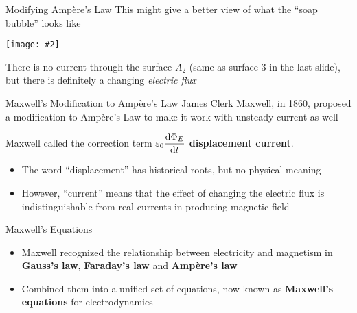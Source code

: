 \documentclass[12pt,aspectratio=169]{beamer}
\newcommand{\pic}[2]{\texttt{[image: \#2]}}
\newcommand{\eq}[2]{
  \vspace{#1}{\Large\begin{displaymath}#2\end{displaymath}}
}
\begin{document}
\begin{frame}{Modifying Amp\`{e}re's Law}
  This might give a better view of what the ``soap bubble'' looks like
  \begin{center}
    \pic{.5}{bubble.png}
  \end{center}
  There is no current through the surface $A_2$ (same as surface \num{3} in the
  last slide), but there is definitely a changing \emph{electric flux}
\end{frame}



\begin{frame}{Maxwell's Modification to Amp\`{e}re's Law}
  James Clerk Maxwell, in 1860, proposed a modification to Amp\`{e}re's Law
  to make it work with unsteady current as well

  \eq{-.1in}{
    \boxed{
      \oint\bm{B}\cdot\dl\boldsymbol{\ell}=\mu_0\left( I +
      \varepsilon_0 \diff{\Phi_E}t\right)
    }
  }

  Maxwell called the correction term $\displaystyle\varepsilon_0\diff{\Phi_E}t$
  \textbf{displacement current}.
  \begin{itemize}
  \item The word ``displacement'' has historical roots, but no physical meaning
  \item However, ``current'' means that the effect of changing the electric
    flux is indistinguishable from real currents in producing magnetic field
  \end{itemize}
\end{frame}



\begin{frame}{Maxwell's Equations}
  \begin{itemize}
  \item Maxwell recognized the relationship between electricity and
    magnetism in \textbf{Gauss's law}, \textbf{Faraday's law} and
    \textbf{Amp\`{e}re's law}
  \item Combined them into a unified set of equations, now known as
    \textbf{Maxwell's equations} for electrodynamics
  \end{itemize}
\end{frame}
\end{document}
